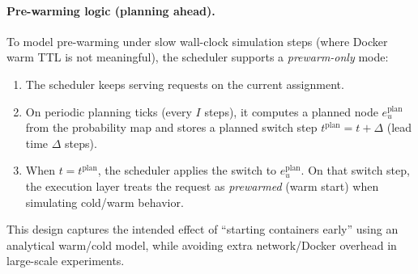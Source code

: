 \paragraph{Pre-warming logic (planning ahead).}
To model pre-warming under slow wall-clock simulation steps (where Docker warm TTL is not meaningful), the scheduler supports a \emph{prewarm-only} mode:
\begin{enumerate}
  \item The scheduler keeps serving requests on the current assignment.
  \item On periodic planning ticks (every \(I\) steps), it computes a planned node \(e^{\text{plan}}_u\) from the probability map and stores a planned switch step \(t^{\text{plan}} = t + \Delta\) (lead time \(\Delta\) steps).
  \item When \(t=t^{\text{plan}}\), the scheduler applies the switch to \(e^{\text{plan}}_u\). On that switch step, the execution layer treats the request as \emph{prewarmed} (warm start) when simulating cold/warm behavior.
\end{enumerate}
This design captures the intended effect of ``starting containers early'' using an analytical warm/cold model, while avoiding extra network/Docker overhead in large-scale experiments.

